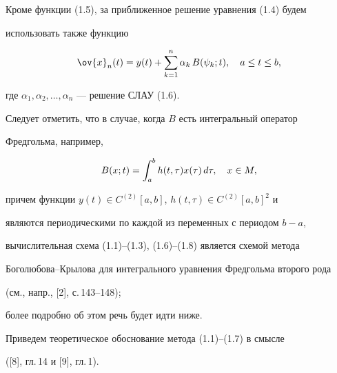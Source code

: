 Кроме функции (1.5), за приближенное решение уравнения (1.4) будем 


использовать также функцию


\begin{equation}


\ov{x}_n(t)=y(t)+\sum_{k=1}^n\alpha_k\, B(\psi_k;t),\quad a\leq t\leq b,


\end{equation}


где $\alpha_1,\alpha_2,\dotsc,\alpha_n$ --- решение СЛАУ (1.6).





Следует отметить, что в случае, когда $B$ есть интегральный оператор 


Фредгольма, например,


\begin{equation}


B(x;t)=\intl_a^bh(t,\tau)x(\tau)\, d\tau,\quad x\in M,


\end{equation}


причем функции $y(t)\in C^{(2)}[a,b]$, $h(t,\tau)\in C^{(2)}[a,b]^2$ и


являются периодическими по каждой из переменных с периодом $b-a$,


вычислительная схема (1.1)--(1.3), (1.6)--(1.8) является схемой метода


Боголюбова--Крылова для интегрального уравнения Фредгольма второго рода


(см., напр., [2], с.\,143--148);


более подробно об этом речь будет идти ниже.





Приведем теоретическое обоснование метода (1.1)--(1.7) в смысле


([8], гл.\,14 и [9], гл.\,1).





